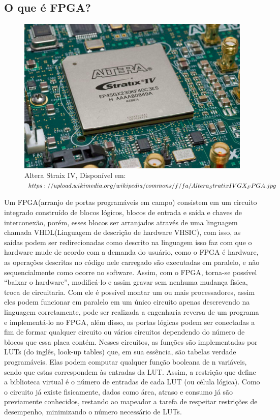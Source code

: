 \documentclass[12pt,a4paper]{article}
\begin{document}
\subsection{O que é FPGA?}

\begin{figure}[!htb]
\includegraphics[scale=0.5]{49aWla.png}
\centering 
\caption{Altera Straix IV, Disponível em: $https:// upload.wikimedia.org/ \newline wikipedia/commons/f/fa/Altera_StratixIVGX_FPGA.jpg$}
\end{figure}
\qquad Um FPGA(arranjo de portas programáveis em campo) consistem em um circuito integrado construído de  blocos lógicos, blocos de entrada e saída e chaves de interconexão, porém, esses blocos ser arranjados através de uma linguagem chamada VHDL(Linguagem de descrição de hardware VHSIC), com isso, as saídas podem ser redirecionadas como descrito na linguagem isso faz com que o hardware mude de acordo com a demanda do usuário, como o FPGA é hardware, as operações descritas no código nele carregado são executadas em paralelo, e não sequencialmente como ocorre no software.
	Assim, com o FPGA, torna-se possível “baixar o hardware”, modificá-lo e assim gravar sem nenhuma mudança física, troca de circuitaria. Com ele é possível montar um ou mais processadores, assim eles podem funcionar em paralelo em um único circuito apenas descrevendo na linguagem corretamente, pode ser realizada a engenharia reversa de um programa e implementá-lo no FPGA, além disso, as portas lógicas podem ser conectadas a fim de formar qualquer circuito ou vários circuitos dependendo do número de blocos que essa placa contém.
Nesses circuitos, as funções são implementadas por LUTs (do inglês, look-up tables) que, em sua essência, são tabelas verdade programáveis. Elas podem computar qualquer função booleana de n variáveis, sendo que estas correspondem às entradas da LUT. Assim, a restrição que define a biblioteca virtual é o número de entradas de cada LUT (ou célula lógica). Como o circuito já existe fisicamente, dados como área, atraso e consumo já são previamente conhecidos, restando ao mapeador a tarefa de respeitar restrições de desempenho, minimizando o número necessário de LUTs.
\end{document}
